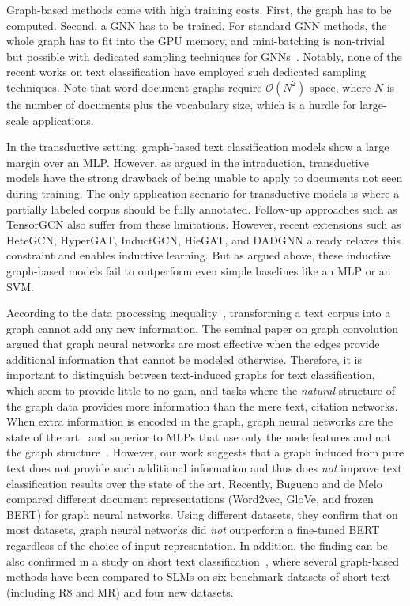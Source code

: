 \documentclass[acmsmall,nonacm]{acmart}
\newcommand{\SLMs}{SLMs\xspace}
\begin{document}
Graph-based methods come with high training costs.
First, the graph has to be computed.
Second, a GNN has to be trained. 
For standard GNN methods, the whole graph has to fit into the GPU memory, and mini-batching is non-trivial but possible with dedicated sampling techniques for GNNs~\cite{DBLP:conf/icml/FeyLWL21}. 
Notably, none of the recent works on text classification have employed such dedicated sampling techniques.
Note that word-document graphs require $\mathcal{O}(N^2)$ space, where $N$ is the number of documents plus the vocabulary size, which is a hurdle for large-scale applications.
 
In the transductive setting, graph-based text classification models show a large margin over an MLP.
However, as argued in the introduction, transductive models have the strong drawback of being unable to apply to documents not seen during training.
The only application scenario for transductive models is where a partially labeled corpus should be fully annotated. 
Follow-up approaches such as TensorGCN also suffer from these limitations.
However, recent extensions such as HeteGCN, HyperGAT, InductGCN, HieGAT, and DADGNN already relaxes this constraint and enables inductive learning.
But as argued above, these inductive graph-based models fail to outperform even simple baselines like an MLP or an SVM.

According to the data processing inequality~\cite{cover_elements_1991}, transforming a text corpus into a graph cannot add any new information.
The seminal paper on graph convolution~\etal\cite{DBLP:conf/iclr/KipfW17} argued that graph neural networks are most effective when the edges provide additional information that cannot be modeled otherwise.
Therefore, it is important to distinguish between text-induced graphs for text classification, which seem to provide little to no gain, and tasks where the \emph{natural} structure of the graph data provides more information than the mere text, \eg citation networks. 
When extra information is encoded in the graph, graph neural networks are the state of the art~\cite{DBLP:conf/iclr/KipfW17,velickovic2018graph} and superior to MLPs that use only the node features and not the graph structure~\cite{DBLP:journals/corr/abs-1811-05868}.
However, our work suggests that a graph induced from pure text does not provide such additional information and thus does \emph{not} improve text classification results over the state of the art.
Recently, Bugueno and de Melo~\cite{buguenoConnectingDotsWhat2023} compared different document representations (Word2vec, GloVe, and frozen BERT) for graph neural networks.
Using different datasets, they confirm that on most datasets, graph neural networks did \emph{not} outperform a fine-tuned BERT regardless of the choice of input representation. In addition, the finding can be also confirmed in a study on short text classification~\cite{DBLP:conf/cdmake/KarlS23},
where several graph-based methods have been compared to \SLMs on six benchmark datasets of short text (including R8 and MR) and four new datasets.
\end{document}
